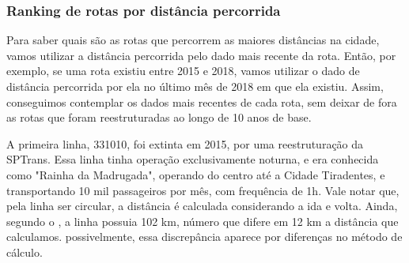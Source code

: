 \subsubsection{Ranking de rotas por distância percorrida}

Para saber quais são as rotas que percorrem as maiores distâncias na cidade, vamos utilizar a distância percorrida pelo dado mais recente da rota. Então, por exemplo, se uma rota existiu entre 2015 e 2018, vamos utilizar o dado de distância percorrida por ela no último mês de 2018 em que ela existiu. Assim, conseguimos contemplar os dados mais recentes de cada rota, sem deixar de fora as rotas que foram reestruturadas ao longo de 10 anos de base.

\begin{table}[H]
\caption{Ranking das top 10 linhas com maior distância percorrida. Fonte: A própria autora.}
\label{tab:distancias_rotas}
\end{table}

A primeira linha, 331010, foi extinta em 2015, por uma reestruturação da SPTrans. Essa linha tinha operação exclusivamente noturna, e era conhecida como "Rainha da Madrugada", operando do centro até a Cidade Tiradentes, e transportando 10 mil passageiros por mês, com frequência de 1h. Vale notar que, pela linha ser circular, a distância é calculada considerando a ida e volta. Ainda, segundo o \citet{rainha_da_madrugada}, a linha possuia 102 km, número que difere em 12 km a distância que calculamos. possivelmente, essa discrepância aparece por diferenças no método de cálculo. 

